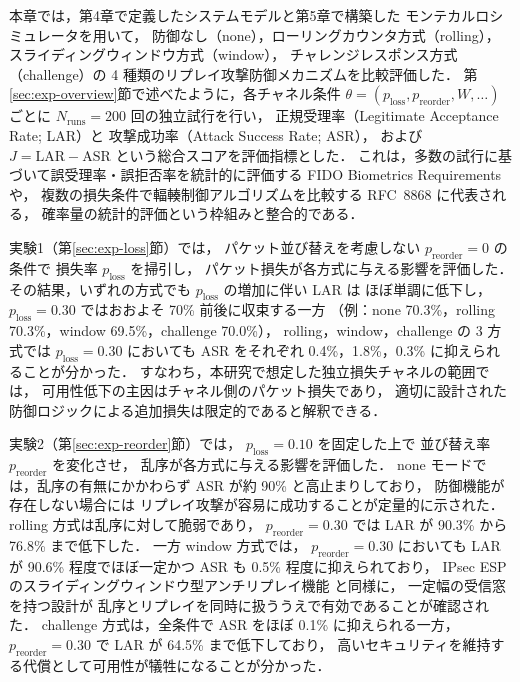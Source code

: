 \documentclass[twocolumn,10pt,a4paper]{jsarticle}
\begin{document}
\label{subsec:exp-summary}

本章では，第4章で定義したシステムモデルと第5章で構築した
モンテカルロシミュレータ\cite{ReplaySimReadmeJP}を用いて，
防御なし（none），ローリングカウンタ方式（rolling），
スライディングウィンドウ方式（window），
チャレンジレスポンス方式（challenge）の
4 種類のリプレイ攻撃防御メカニズムを比較評価した．
第\ref{sec:exp-overview}節で述べたように，各チャネル条件
$\theta = (p_{\mathrm{loss}}, p_{\mathrm{reorder}}, W, \ldots)$ ごとに
$N_{\mathrm{runs}} = 200$ 回の独立試行を行い，
正規受理率（Legitimate Acceptance Rate; LAR）と
攻撃成功率（Attack Success Rate; ASR），
および $J = \mathrm{LAR} - \mathrm{ASR}$ という総合スコアを評価指標とした．
これは，多数の試行に基づいて誤受理率・誤拒否率を統計的に評価する
FIDO Biometrics Requirements\cite{FIDO-Bio} や，
複数の損失条件で輻輳制御アルゴリズムを比較する
RFC~8868\cite{RFC8868} に代表される，
確率量の統計的評価という枠組みと整合的である．

実験1（第\ref{sec:exp-loss}節）では，
パケット並び替えを考慮しない $p_{\mathrm{reorder}} = 0$ の条件で
損失率 $p_{\mathrm{loss}}$ を掃引し，
パケット損失が各方式に与える影響を評価した．
その結果，いずれの方式でも $p_{\mathrm{loss}}$ の増加に伴い LAR は
ほぼ単調に低下し，
$p_{\mathrm{loss}} = 0.30$ ではおおよそ 70\% 前後に収束する一方
（例：none 70.3\%，rolling 70.3\%，window 69.5\%，challenge 70.0\%），
rolling，window，challenge の 3 方式では
$p_{\mathrm{loss}} = 0.30$ においても
ASR をそれぞれ 0.4\%，1.8\%，0.3\% に抑えられることが分かった．
すなわち，本研究で想定した独立損失チャネルの範囲では，
可用性低下の主因はチャネル側のパケット損失であり，
適切に設計された防御ロジックによる追加損失は限定的であると解釈できる．

実験2（第\ref{sec:exp-reorder}節）では，
$p_{\mathrm{loss}} = 0.10$ を固定した上で
並び替え率 $p_{\mathrm{reorder}}$ を変化させ，
乱序が各方式に与える影響を評価した．
none モードでは，乱序の有無にかかわらず
ASR が約 90\% と高止まりしており，
防御機能が存在しない場合には
リプレイ攻撃が容易に成功することが定量的に示された．
rolling 方式は乱序に対して脆弱であり，
$p_{\mathrm{reorder}} = 0.30$ では LAR が 90.3\% から 76.8\% まで低下した．
一方 window 方式では，
$p_{\mathrm{reorder}} = 0.30$ においても
LAR が 90.6\% 程度でほぼ一定かつ
ASR も 0.5\% 程度に抑えられており，
IPsec ESP のスライディングウィンドウ型アンチリプレイ機能
\cite{rfc4303,rfc6479} と同様に，
一定幅の受信窓を持つ設計が
乱序とリプレイを同時に扱ううえで有効であることが確認された．
challenge 方式は，全条件で ASR をほぼ 0.1\% に抑えられる一方，
$p_{\mathrm{reorder}} = 0.30$ で LAR が 64.5\% まで低下しており，
高いセキュリティを維持する代償として可用性が犠牲になることが分かった．
\end{document}
